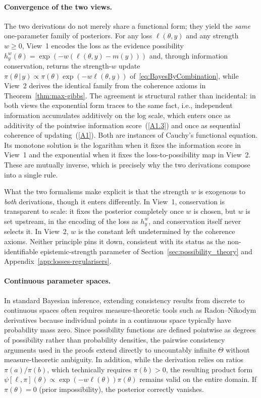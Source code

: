 \documentclass[accepted]{uai2026} %
\def\given{\,|\,}
\theoremstyle{remark}
\begin{document}
\paragraph{Convergence of the two views.} The two derivations do not merely share a functional form; they yield the \emph{same} one-parameter family of posteriors. For any loss $\ell(\theta,y)$ and any strength $w\ge0$, View~1 encodes the loss as the evidence possibility $h_y^{w}(\theta)=\exp(-w(\ell(\theta,y)-m(y)))$ and, through information conservation, returns the strength-$w$ update $\pi(\theta\given y)\propto\pi(\theta)\exp(-w\ell(\theta,y))$ of~\eqref{eq:BayesByCombination}, while View~2 derives the identical family from the coherence axioms in Theorem~\ref{thm:max-gibbs}. The agreement is structural rather than incidental: in both views the exponential form traces to the same fact, i.e., independent information accumulates additively on the log scale, which enters once as additivity of the pointwise information score~(\ref{A1.3}) and once as sequential coherence of updating~(\ref{A1}). Both are instances of Cauchy's functional equation. Its monotone solution is the logarithm when it fixes the information score in View~1 and the exponential when it fixes the loss-to-possibility map in View~2. These are mutually inverse,
which is precisely why the two derivations compose into a single rule.

What the two formalisms make explicit is that the strength $w$ is exogenous to \emph{both} derivations, though it enters differently. In View~1, conservation is transparent to scale: it fixes the posterior completely once $w$ is chosen, but $w$ is set upstream, in the encoding of the loss as $h_y^{w}$, and conservation itself never selects it. In View~2, $w$ is the constant left undetermined by the coherence axioms. Neither principle pins it down, consistent with its status as the non-identifiable epistemic-strength parameter of Section~\ref{sec:possibility_theory} and Appendix~\ref{app:losses-regularisers}.

\paragraph{Continuous parameter spaces.} In standard Bayesian inference, extending consistency results from discrete to continuous spaces often requires measure-theoretic tools such as Radon--Nikodym derivatives because individual points in a continuous space typically have probability mass zero. Since possibility functions are defined pointwise as degrees of possibility rather than probability densities, the pairwise consistency arguments used in the proofs extend directly to uncountably infinite $\Theta$ without measure-theoretic ambiguity. In addition, while the derivation relies on ratios $\pi(a)/\pi(b)$, which technically requires $\pi(b) > 0$, the resulting product form $\psi[\ell,\pi](\theta) \propto \exp(-w \ell(\theta)) \pi(\theta)$ remains valid on the entire domain. If $\pi(\theta) = 0$ (prior impossibility), the posterior correctly vanishes.
\end{document}
